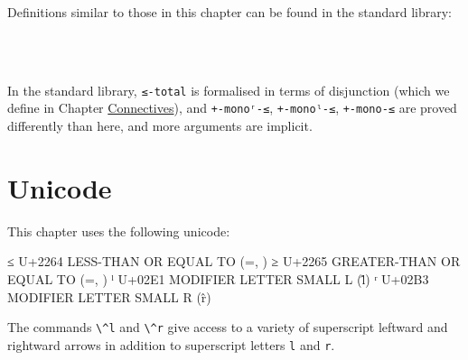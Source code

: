 Definitions similar to those in this chapter can be found in the
standard library:

\begin{fence}
\begin{code}%
\>[0]\AgdaSpace{}%
\AgdaSpace{}%
\AgdaSpace{}%
\AgdaSymbol{(}\AgdaSymbol{;}\AgdaSpace{}%
\AgdaSymbol{;}\AgdaSpace{}%
\AgdaSymbol{)}\<%
\\
\>[0]\AgdaSpace{}%
\AgdaSpace{}%
%
\>[625I]\AgdaSymbol{(}\AgdaSymbol{;}\AgdaSpace{}%
\AgdaSymbol{;}\AgdaSpace{}%
\AgdaSymbol{;}\AgdaSpace{}%
\AgdaSymbol{;}\<%
\\
\>[625I][@{}l@{\AgdaIndent{0}}]%
\>[34]\AgdaSymbol{;}\AgdaSpace{}%
\AgdaSymbol{;}\AgdaSpace{}%
\AgdaSymbol{)}\<%
\end{code}
\end{fence}

In the standard library, \texttt{≤-total} is formalised in terms of
disjunction (which we define in Chapter
\protect\hyperlink{Connectives}{Connectives}), and \texttt{+-monoʳ-≤},
\texttt{+-monoˡ-≤}, \texttt{+-mono-≤} are proved differently than here,
and more arguments are implicit.

\hypertarget{unicode}{%
\section{Unicode}\label{unicode}}

This chapter uses the following unicode:

\begin{myDisplay}
≤  U+2264  LESS-THAN OR EQUAL TO (\<=, \le)
≥  U+2265  GREATER-THAN OR EQUAL TO (\>=, \ge)
ˡ  U+02E1  MODIFIER LETTER SMALL L (\^l)
ʳ  U+02B3  MODIFIER LETTER SMALL R (\^r)
\end{myDisplay}

The commands \texttt{\textbackslash{}\^{}l} and
\texttt{\textbackslash{}\^{}r} give access to a variety of superscript
leftward and rightward arrows in addition to superscript letters
\texttt{l} and \texttt{r}.

